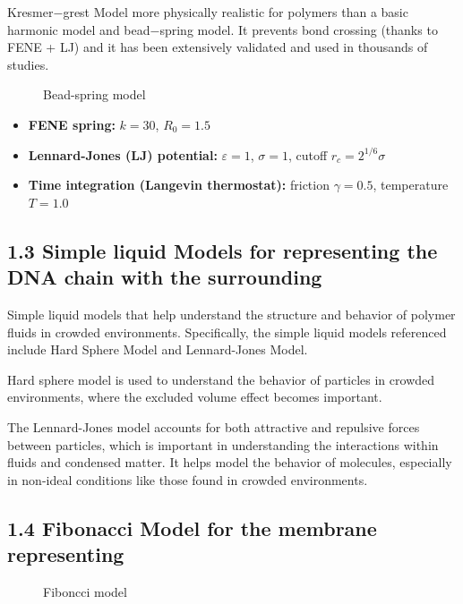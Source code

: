 \documentclass[12pt]{article}
\begin{document}
\begin{flushleft}
Kresmer$-$grest Model more physically realistic for polymers than a basic harmonic model and bead$-$spring model.
It prevents bond crossing (thanks to FENE + LJ) and it has been extensively validated and used in thousands of studies.

\begin{figure}[!ht]
  \centering
  \caption{Bead-spring model }
\end{figure}


\begin{itemize}
  \item \textbf{FENE spring:} \( k = 30 \), \( R_0 = 1.5 \)
  \item \textbf{Lennard-Jones (LJ) potential:} \( \varepsilon = 1 \), \( \sigma = 1 \), cutoff \( r_c = 2^{1/6} \sigma \)
  \item \textbf{Time integration (Langevin thermostat):} friction \( \gamma = 0.5 \), temperature \( T = 1.0 \)
\end{itemize}


\subsection*{1.3 Simple liquid Models for representing the DNA chain with the surrounding}

Simple liquid models that help understand the structure and behavior of polymer fluids in crowded environments. Specifically, the simple liquid models referenced include Hard Sphere Model and Lennard-Jones Model. 


Hard sphere model is used to understand the behavior of particles in crowded environments, where the excluded volume effect becomes important. 


The Lennard-Jones model accounts for both attractive and repulsive forces between particles, which is important in understanding the interactions within fluids and condensed matter. It helps model the behavior of molecules, especially in non-ideal conditions like those found in crowded environments. 

\subsection*{1.4 Fibonacci Model for the membrane representing }
\begin{figure}[!ht]
  \centering
  \caption{Fiboncci model }
\end{figure}



\end{flushleft}
\end{document}
